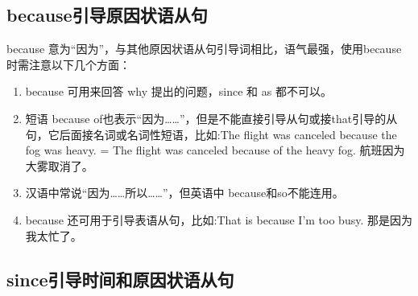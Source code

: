\subsection{because引导原因状语从句}

because 意为“因为”，与其他原因状语从句引导词相比，语气最强，使用because时需注意以下几个方面：
\begin{enumerate}
  \item because 可用来回答 why 提出的问题，since 和 as 都不可以。
  \item 短语 because of也表示“因为……”，但是不能直接引导从句或接that引导的从句，它后面接名词或名词性短语，比如:The flight was canceled because the fog was heavy. = The flight was canceled because of the heavy fog. 航班因为大雾取消了。
  \item 汉语中常说“因为……所以……”，但英语中 because和so不能连用。
  \item because 还可用于引导表语从句，比如:That is because I'm too busy. 那是因为我太忙了。
\end{enumerate}

\subsection{since引导时间和原因状语从句}

